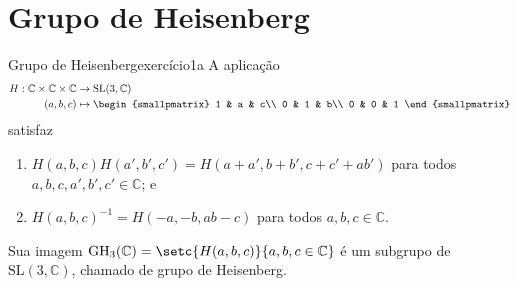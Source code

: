 \section{Grupo de Heisenberg}
\begin{proposition}{Grupo de Heisenberg}{exercício1a}
    A aplicação
    \begin{align*}
        H : \mathbb{C} \times \mathbb{C} \times \mathbb{C} &\to \mathrm{SL}(3,\mathbb{C})\\
                                                   (a,b,c) &\mapsto \begin{smallpmatrix}
                                                               1 & a & c\\
                                                               0 & 1 & b\\
                                                               0 & 0 & 1
                                                           \end{smallpmatrix}
    \end{align*}
    satisfaz
    \begin{enumerate}[label=(\alph*)]
        \item \(H(a,b,c)H(a', b', c') = H(a+ a', b+ b', c+c' +ab')\) para todos \(a,b,c, a',b', c' \in \mathbb{C}\); e
        \item \(H(a,b,c)^{-1} = H(-a,-b,ab-c)\) para todos \(a,b,c \in \mathbb{C}\).
    \end{enumerate}
    Sua imagem \(\mathrm{GH}_3(\mathbb{C}) = \setc{H(a,b,c)}{a,b,c \in \mathbb{C}}\) é um subgrupo de \(\mathrm{SL}(3, \mathbb{C})\), chamado de grupo de Heisenberg.
\end{proposition}

